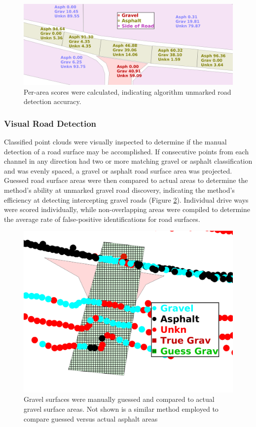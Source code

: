 \documentclass[numbered,pdftex]{ohio-etd}
\begin{document}
{{{{{				\begin{figure}[H]
					\centering
					\includegraphics[width=0.90\linewidth]{Defense_Images/rm_db_1_area_score}
					\caption[Area Scores]{Per-area scores were calculated, indicating algorithm unmarked road detection accuracy. }
					\label{fig:prepostadjust}
				\end{figure}

				
			}
		
			\subsubsection{Visual Road Detection}\label{sec:manual_road_detection}{
			
				{Classified point clouds were visually inspected to determine if the manual detection of a road surface may be accomplished. If consecutive points from each channel in any direction had two or more matching gravel or asphalt classification and was evenly spaced, a gravel or asphalt road surface area was projected. Guessed road surface areas were then compared to actual areas to determine the method's ability at unmarked gravel road discovery, indicating the method's efficiency at detecting intercepting gravel roads (Figure \ref{fig:rm_db_4_toc}). Individual drive ways were scored individually, while non-overlapping areas were compiled to determine the average rate of false-positive identifications for road surfaces.}	
				
				\begin{figure}[H]
					\centering
					\includegraphics[width=0.9\linewidth]{Defense_Images/range_db_6_overlap_2}
					\caption[Projected Visual Guess vs Truth]{Gravel surfaces were manually guessed and compared to actual gravel surface areas. Not shown is a similar method employed to compare guessed versus actual asphalt areas}
					\label{fig:rm_db_4_toc}
				\end{figure}	
	
}}}}}
\end{document}
